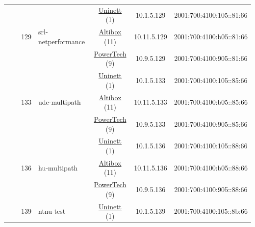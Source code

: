 \begin{small}
\begin{center}
\begin{longtable}{|c|c|c|c|c|c|c|c|}
  &  & \multirow{3}{*}{\tiny{129}} & \multicolumn{1}{|l|}{\multirow{3}{*}{\tiny{srl-netperformance}}} & \multicolumn{2}{|c|}{\tiny{\href{https://www.uninett.no}{Uninett} (1)}} & \tiny{10.1.5.129} & \tiny{2001:700:4100:105::81:66} \\* \cline{5-5}\cline{6-6}\cline{7-7}\cline{8-8}
  &  &  &  & \multicolumn{2}{|c|}{\tiny{\href{https://www.altibox.no}{Altibox} (11)}} & \tiny{10.11.5.129} & \tiny{2001:700:4100:b05::81:66} \\* \cline{5-5}\cline{6-6}\cline{7-7}\cline{8-8}
  &  &  &  & \multicolumn{2}{|c|}{\tiny{\href{http://www.powertech.no}{PowerTech} (9)}} & \tiny{10.9.5.129} & \tiny{2001:700:4100:905::81:66} \\* \cline{3-3}\cline{4-4}\cline{5-5}\cline{6-6}\cline{7-7}\cline{8-8}
  &  & \multirow{3}{*}{\tiny{133}} & \multicolumn{1}{|l|}{\multirow{3}{*}{\tiny{ude-multipath}}} & \multicolumn{2}{|c|}{\tiny{\href{https://www.uninett.no}{Uninett} (1)}} & \tiny{10.1.5.133} & \tiny{2001:700:4100:105::85:66} \\* \cline{5-5}\cline{6-6}\cline{7-7}\cline{8-8}
  &  &  &  & \multicolumn{2}{|c|}{\tiny{\href{https://www.altibox.no}{Altibox} (11)}} & \tiny{10.11.5.133} & \tiny{2001:700:4100:b05::85:66} \\* \cline{5-5}\cline{6-6}\cline{7-7}\cline{8-8}
  &  &  &  & \multicolumn{2}{|c|}{\tiny{\href{http://www.powertech.no}{PowerTech} (9)}} & \tiny{10.9.5.133} & \tiny{2001:700:4100:905::85:66} \\* \cline{3-3}\cline{4-4}\cline{5-5}\cline{6-6}\cline{7-7}\cline{8-8}
  &  & \multirow{3}{*}{\tiny{136}} & \multicolumn{1}{|l|}{\multirow{3}{*}{\tiny{hu-multipath}}} & \multicolumn{2}{|c|}{\tiny{\href{https://www.uninett.no}{Uninett} (1)}} & \tiny{10.1.5.136} & \tiny{2001:700:4100:105::88:66} \\* \cline{5-5}\cline{6-6}\cline{7-7}\cline{8-8}
  &  &  &  & \multicolumn{2}{|c|}{\tiny{\href{https://www.altibox.no}{Altibox} (11)}} & \tiny{10.11.5.136} & \tiny{2001:700:4100:b05::88:66} \\* \cline{5-5}\cline{6-6}\cline{7-7}\cline{8-8}
  &  &  &  & \multicolumn{2}{|c|}{\tiny{\href{http://www.powertech.no}{PowerTech} (9)}} & \tiny{10.9.5.136} & \tiny{2001:700:4100:905::88:66} \\* \cline{3-3}\cline{4-4}\cline{5-5}\cline{6-6}\cline{7-7}\cline{8-8}
  &  & \multirow{3}{*}{\tiny{139}} & \multicolumn{1}{|l|}{\multirow{3}{*}{\tiny{ntnu-test}}} & \multicolumn{2}{|c|}{\tiny{\href{https://www.uninett.no}{Uninett} (1)}} & \tiny{10.1.5.139} & \tiny{2001:700:4100:105::8b:66} \\* \cline{5-5}\cline{6-6}\cline{7-7}\cline{8-8}

\end{longtable}
\end{center}
\end{small}
